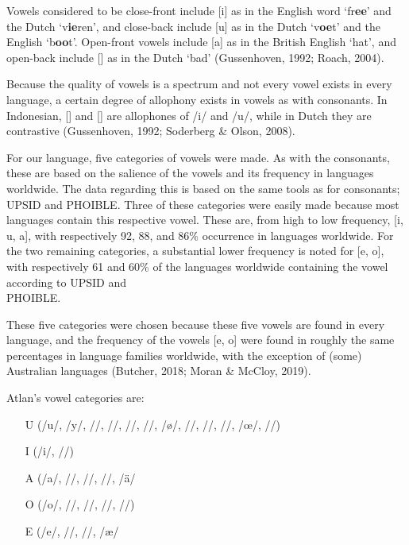 Vowels considered to be close-front include [i] as in the English word ‘fr{\bf ee}’ and the Dutch ‘v{\bf ie}ren’, and close-back include [u] as in the Dutch ‘v{\bf oe}t’ and the English ‘b{\bf oo}t’. Open-front vowels include [a] as in the British English ‘hat’, and open-back include [\textscripta] as in the Dutch ‘bad’ (Gussenhoven, 1992; Roach, 2004). 

Because the quality of vowels is a spectrum and not every vowel exists in every language, a certain degree of allophony exists in vowels as with consonants. In Indonesian, [\textsci] and [\textupsilon] are allophones of /i/ and /u/, while in Dutch they are contrastive (Gussenhoven, 1992; Soderberg \& Olson, 2008). 

For our language, five categories of vowels were made. As with the consonants, these are based on the salience of the vowels and its frequency in languages worldwide. The data regarding this is based on the same tools as for consonants; UPSID and PHOIBLE. Three of these categories were easily made because most languages contain this respective vowel. These are, from high to low frequency, [i, u, a], with respectively 92, 88, and 86\% occurrence in languages worldwide. For the two remaining categories, a substantial lower frequency is noted for [e, o], with respectively 61 and 60\% of the languages worldwide containing the vowel according to UPSID and \\ PHOIBLE. 

These five categories were chosen because these five vowels are found  in every language, and the frequency of the vowels [e, o] were found  in roughly the same percentages in language families worldwide, with the exception of (some) Australian languages (Butcher, 2018; Moran \& McCloy, 2019). 

Atlan's vowel categories are:
\begin{itemize}
\item[U] (/u/, /y/, /\textbari/, /\textbaru/, /\textturnm/, /\textscy/, /\o/, /\textreve/, /\textbaro/, /\textbabygamma/, /\oe/, /\textscoelig/)
\item[I] (/i/, /\textsci/)
\item[A] (/a/, /\textscripta/, /\textturnscripta/, /\textturna/, /\"{a}/
\item[O] (/o/, /\textopeno/, /\textupsilon/, /\textturnv/, /\textcloseepsilon/)
\item[E] (/e/, /\textrevepsilon/, /\textepsilon/, /\ae/
\end{itemize}


